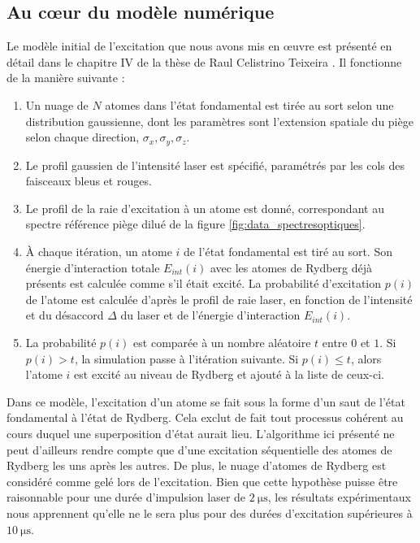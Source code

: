 	\subsection{Au c\oe ur du modèle numérique}\label{subsec:algo_1}
\noindent Le modèle initial de l'excitation que nous avons mis en \oe uvre est présenté en détail dans le chapitre IV de la thèse de Raul Celistrino Teixeira \cite{PHD_CELISTRINO}.
Il fonctionne de la manière suivante :
\begin{enumerate}
	\item Un nuage de $N$ atomes dans l'état fondamental est tirée au sort selon une distribution gaussienne, dont les paramètres sont l'extension spatiale du piège selon chaque direction, $\sigma_x,\sigma_y,\sigma_z$.
	\item Le profil gaussien de l'intensité laser est spécifié, paramétrés par les cols des faisceaux bleus et rouges.
	\item Le profil de la raie d'excitation à un atome est donné, correspondant au spectre \og référence piège dilué \fg{} de la figure \eqref{fig:data_spectresoptiques}.
	\item \`A chaque itération, un atome $i$ de l'état fondamental est tiré au sort.
	Son énergie d'interaction totale $E_{int}(i)$ avec les atomes de Rydberg déjà présents est calculée comme s'il était excité.
	La probabilité d'excitation $p(i)$ de l'atome est calculée d'après le profil de raie laser, en fonction de l'intensité  et du désaccord $\Delta$ du laser et de l'énergie d'interaction $E_{int}(i)$.
	\item La probabilité $p(i)$ est comparée à un nombre aléatoire $t$ entre $0$ et $1$. Si $p(i)>t$, la simulation passe à l'itération suivante.
	Si $p(i)\leq t$, alors l'atome $i$ est excité au niveau de Rydberg et ajouté à la liste de ceux-ci.
\end{enumerate}
%
Dans ce modèle, l'excitation d'un atome se fait sous la forme d'un \og saut \fg{} de l'état fondamental à l'état de Rydberg.
Cela exclut de fait tout processus cohérent au cours duquel une superposition d'état aurait lieu.
L'algorithme ici présenté ne peut d'ailleurs rendre compte que d'une excitation séquentielle des atomes de Rydberg les uns après les autres.
De plus, le nuage d'atomes de Rydberg est considéré comme gelé lors de l'excitation.
Bien que cette hypothèse puisse être raisonnable pour une durée d'impulsion laser de $\SI{2}{\us}$, les résultats expérimentaux nous apprennent qu'elle ne le sera plus pour des durées d'excitation supérieures à $\SI{10}{\us}$.

